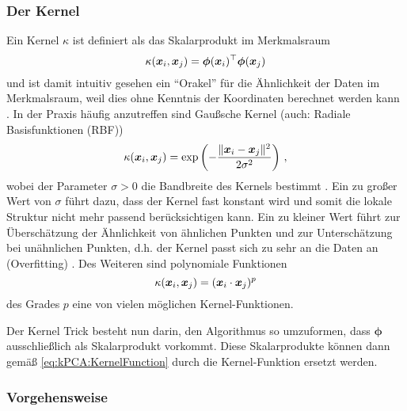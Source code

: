 \subsubsection{Der Kernel}
\label{ch:MethodenDerDimRed:statistisch:kPCA:KernelFunktion}

Ein Kernel $\kappa$ ist definiert als das Skalarprodukt im Merkmalsraum \parencite[34]{ShaweTaylor.2011}
\begin{equation}
	\label{eq:kPCA:KernelFunction}
	\kappa(\bm{x}_i, \bm{x}_j) = \bm{\phi}(\bm{x}_i)^\top \bm{\phi}(\bm{x}_j)
\end{equation}
und ist damit intuitiv gesehen ein \enquote{Orakel} für die Ähnlichkeit der Daten im Merkmalsraum, weil dies ohne Kenntnis der Koordinaten berechnet werden kann \parencite[71]{ShaweTaylor.2011}. In der Praxis häufig anzutreffen sind Gaußsche Kernel (auch: Radiale
Basisfunktionen (RBF))
\begin{equation}
	\kappa(\bm{x}_i, \bm{x}_j) = \exp \left(- \frac{\lVert \bm{x}_i - \bm{x}_j\rVert^2}{2\sigma^2}\right) \, ,
\end{equation}
wobei der Parameter $\sigma > 0$ die Bandbreite des Kernels bestimmt \parencite[296]{ShaweTaylor.2011}. Ein zu großer Wert von $\sigma$ führt dazu, dass der Kernel fast
konstant wird und somit die lokale Struktur nicht mehr passend berücksichtigen kann. Ein zu kleiner
Wert führt zur Überschätzung der Ähnlichkeit von ähnlichen Punkten und zur Unterschätzung bei
unähnlichen Punkten, d.h. der Kernel passt sich zu sehr an die Daten an (Overfitting) \parencite[296 -- 297]{ShaweTaylor.2011}. Des Weiteren sind polynomiale Funktionen \parencite[292]{ShaweTaylor.2011}
\begin{equation}
	\kappa(\bm{x}_i, \bm{x}_j) = (\bm{x}_i \cdot \bm{x}_j)^p
\end{equation}
des Grades $p$ eine von vielen möglichen Kernel-Funktionen.

Der Kernel Trick besteht nun darin, den Algorithmus so umzuformen, dass $\bm{\phi}$ ausschließlich
als Skalarprodukt vorkommt. Diese Skalarprodukte können dann gemäß \eqref{eq:kPCA:KernelFunction}
durch die Kernel-Funktion ersetzt werden.

\subsubsection{Vorgehensweise}
\label{ch:MethodenDerDimRed:statistisch:kPCA:Vorgehensweise}

